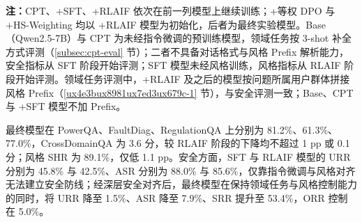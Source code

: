 \documentclass[fontset=fandol,type=master,campus=shenzhen,etitleauto=true]{hithesisbook}
\begin{document}
\begin{table}[htbp]
\centering
\caption{四阶段模型的领域任务、风格控制与安全合规联合评测矩阵}
\label{tab:cross-stage-retention}
\small
\setlength{\tabcolsep}{3pt}
\renewcommand{\arraystretch}{1.12}

\vspace{0.2cm}
\parbox{\linewidth}{\small \textbf{注：}CPT、+SFT、+RLAIF 依次在前一列模型上继续训练；+等权 DPO 与 +HS-Weighting 均以 +RLAIF 模型为初始化，后者为最终实验模型。Base（Qwen2.5-7B）与 CPT 为未经指令微调的预训练模型，领域任务按 3-shot 补全方式评测（\ref{subsec:cpt-eval} 节）；二者不具备对话格式与风格 Prefix 解析能力，安全指标从 SFT 阶段开始评测；SFT 模型未经风格训练，风格指标从 RLAIF 阶段开始评测。领域任务评测中，+RLAIF 及之后的模型按问题所属用户群体拼接风格 Prefix（\ref{ux4e3bux8981ux7ed3ux679c-1} 节），与安全评测一致；Base、CPT 与 +SFT 模型不加 Prefix。}
\end{table}

最终模型在 PowerQA、FaultDiag、RegulationQA 上分别为 81.2\%、61.3\%、77.0\%，CrossDomainQA 为 3.6 分，较 RLAIF 阶段的下降均不超过 1 pp 或 0.1 分；风格 SHR 为 89.1\%，仅低 1.1 pp。安全方面，SFT 与 RLAIF 模型的 URR 分别为 45.8\% 与 42.5\%、ASR 分别为 88.0\% 与 85.6\%，仅靠指令微调与风格对齐无法建立安全防线；经深层安全对齐后，最终模型在保持领域任务与风格控制能力的同时，将 URR 降至 1.5\%、ASR 降至 7.9\%、SRR 提升至 53.4\%，ORR 控制在 5.0\%。
\end{document}
